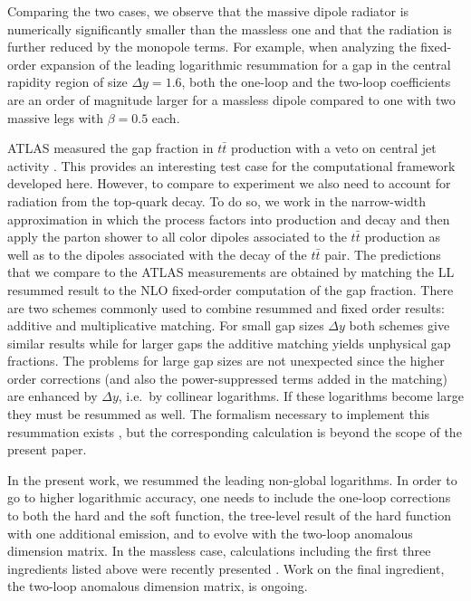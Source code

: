 \documentclass[11pt,a4paper]{article}
\begin{document}
Comparing the two cases, we observe that the massive dipole radiator is numerically significantly smaller than the massless one and that the radiation is further reduced by the monopole terms. For example, when analyzing the fixed-order expansion of the leading logarithmic resummation for a gap in the central rapidity region of size $\Delta y = 1.6$, both the one-loop and the two-loop coefficients are an order of magnitude larger for a massless dipole compared to one with two massive legs with $\beta=0.5$ each. 

ATLAS measured the gap fraction in $t\bar{t}$ production with a veto on central jet activity \cite{ATLAS:2012al}. This provides an interesting test case for the computational framework developed here.  However, to compare to experiment we also need to account for radiation from the top-quark decay. To do so, we work in the narrow-width approximation in which the process factors into production and decay and then apply the parton shower to all color dipoles associated to the $t\bar{t}$ production as well as to the dipoles associated with the decay of the $t\bar{t}$ pair. The predictions that we compare to the ATLAS measurements are obtained by matching the LL resummed result to the NLO fixed-order computation of the gap fraction. There are two schemes commonly used to combine resummed and fixed order results: additive and multiplicative matching. For small gap sizes $\Delta y$ both schemes give similar results while for larger gaps the additive matching  yields unphysical gap fractions. The problems for large gap sizes are not unexpected since the higher order corrections (and also the power-suppressed terms added in the matching) are enhanced by $\Delta y$, i.e.\ by collinear logarithms. If these logarithms become large they must be resummed as well. The formalism necessary to implement this resummation exists \cite{Becher:2015hka,Becher:2016mmh}, but the corresponding  calculation is beyond the scope of the present paper. 

In the present work, we resummed the leading non-global logarithms. In order to go to higher logarithmic accuracy, one needs to include the one-loop corrections to both the hard and the soft function,  the tree-level result of the hard function with one additional emission, and to evolve with the two-loop anomalous dimension matrix. In the massless case,  calculations including the first three ingredients listed above were recently presented \cite{Balsiger:2019tne}. Work on the final ingredient, the two-loop anomalous dimension matrix, is ongoing. 
\end{document}
